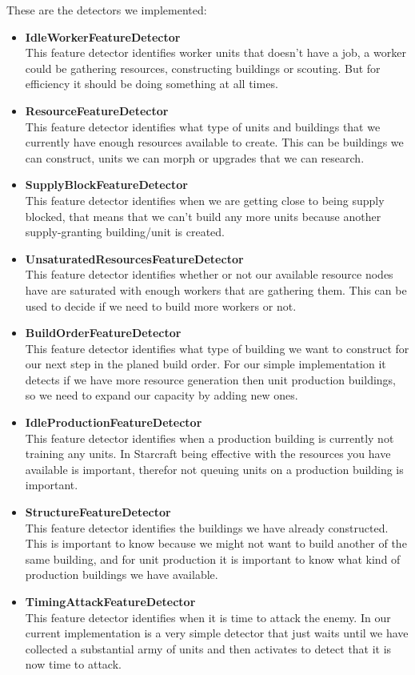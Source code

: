 These are the detectors we implemented: 
\begin{itemize}
\item \textbf{IdleWorkerFeatureDetector} \\
This feature detector identifies worker units that doesn't have a job, a worker could be gathering resources, constructing buildings or scouting. But for efficiency it should be doing something at all times. 
\item \textbf{ResourceFeatureDetector} \\
This feature detector identifies what type of units and buildings that we currently have enough resources available to create. This can be buildings we can construct, units we can morph or upgrades that we can research. 
\item \textbf{SupplyBlockFeatureDetector} \\
This feature detector identifies when we are getting close to being supply blocked, that means that we can't build any more units because another supply-granting building/unit is created.
\item \textbf{UnsaturatedResourcesFeatureDetector} \\
This feature detector identifies whether or not our available resource nodes have are saturated with enough workers that are gathering them. This can be used to decide if we need to build more workers or not.
\item \textbf{BuildOrderFeatureDetector} \\
This feature detector identifies what type of building we want to construct for our next step in the planed build order. For our simple implementation it detects if we have more resource generation then unit production buildings, so we need to expand our capacity by adding new ones. 
\item \textbf{IdleProductionFeatureDetector} \\
This feature detector identifies when a production building is currently not training any units. In Starcraft being effective with the resources you have available is important, therefor not queuing units on a production building is important.
\item \textbf{StructureFeatureDetector} \\
This feature detector identifies the buildings we have already constructed. This is important to know because we might not want to build another of the same building, and for unit production it is important to know what kind of production buildings we have available. 
\item \textbf{TimingAttackFeatureDetector} \\
This feature detector identifies when it is time to attack the enemy. In our current implementation is a very simple detector that just waits until we have collected a substantial army of units and then activates to detect that it is now time to attack.
\end{itemize}

